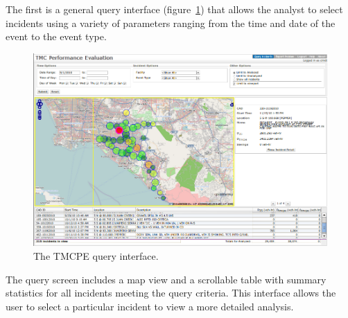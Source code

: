 \documentclass[12pt]{report}
\newcounter{time}
\begin{document}
The first is a general query interface (figure~\ref{fig:tmcpe-query-interface})
that allows the analyst to select incidents using a variety of parameters
ranging from the time and date of the event to the event type.
\begin{figure}[t]
  \begin{center}
    \includegraphics[width=\textwidth]{images/tmcpe-query-interface.png}
    \caption{The TMCPE query interface.}
    \label{fig:tmcpe-query-interface}
  \end{center}
\end{figure}
The query screen includes a map view and a scrollable table with summary
statistics for all incidents meeting the query criteria.  This interface allows
the user to select a particular incident to view a more detailed analysis.
\end{document}
